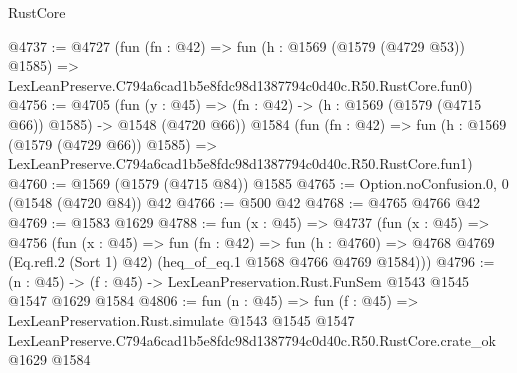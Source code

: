 \begin{lexlean}{RustCore}
\begin{coremodule}
@4737 := @4727
    (fun (fn : @42) =>
    fun (h : @1569 (@1579 (@4729 @53)) @1585) =>
    LexLeanPreserve.C794a6cad1b5e8fdc98d1387794c0d40c.R50.RustCore.fun0)
@4756 := @4705
    (fun (y : @45) => (fn : @42) -> (h : @1569 (@1579 (@4715 @66)) @1585) -> @1548 (@4720 @66))
    @1584
    (fun (fn : @42) =>
    fun (h : @1569 (@1579 (@4729 @66)) @1585) =>
    LexLeanPreserve.C794a6cad1b5e8fdc98d1387794c0d40c.R50.RustCore.fun1)
@4760 := @1569 (@1579 (@4715 @84)) @1585
@4765 := Option.noConfusion.{0, 0} (@1548 (@4720 @84)) @42
@4766 := @500 @42
@4768 := @4765 @4766 @42
@4769 := @1583 @1629
@4788 := fun (x : @45) =>
  @4737
    (fun (x : @45) =>
    @4756
      (fun (x : @45) =>
      fun (fn : @42) =>
      fun (h : @4760) =>
      @4768 @4769 (Eq.refl.{2} (Sort 1) @42) (heq_of_eq.{1} @1568 @4766 @4769 @1584)))
@4796 := (n : @45) -> (f : @45) -> LexLeanPreservation.Rust.FunSem @1543 @1545 @1547 @1629 @1584
@4806 := fun (n : @45) =>
  fun (f : @45) =>
  LexLeanPreservation.Rust.simulate
    @1543
    @1545
    @1547
    LexLeanPreserve.C794a6cad1b5e8fdc98d1387794c0d40c.R50.RustCore.crate_ok
    @1629
    @1584
\end{coremodule}
\end{lexlean}
